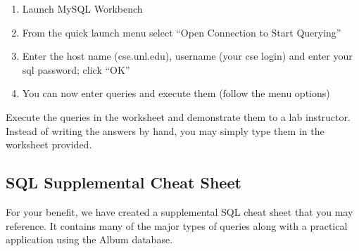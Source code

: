 \documentclass[12pt]{scrartcl}
\begin{document}
\begin{enumerate}
  \item Launch MySQL Workbench
  \item From the quick launch menu select ``Open Connection to Start Querying''
  \item Enter the host name (cse.unl.edu), username (your cse login) 
    and enter your sql password; click ``OK''
  \item You can now enter queries and execute them (follow the menu options)
\end{enumerate}

Execute the queries in the worksheet and demonstrate them to a
lab instructor.  Instead of writing the answers by hand, you may
simply type them in the worksheet provided.
  
\subsection*{SQL Supplemental Cheat Sheet}

For your benefit, we have created a supplemental SQL cheat sheet that 
you may reference.  It contains many of the major types of queries 
along with a practical application using the Album database.
\end{document}
